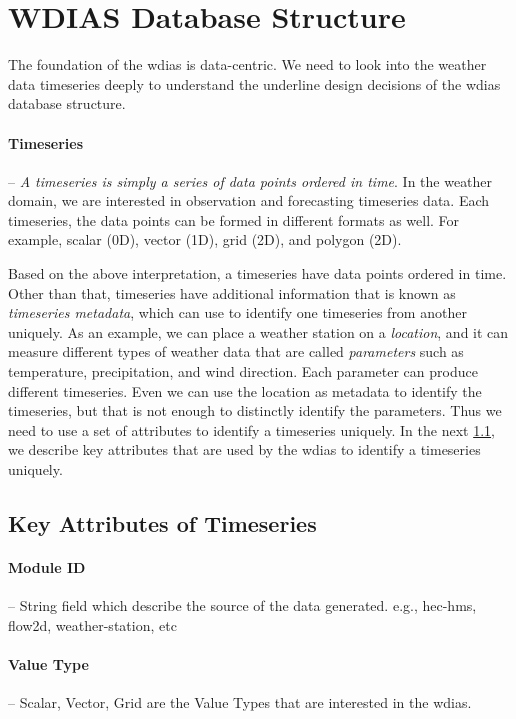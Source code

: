 \section{WDIAS Database Structure}
\label{se:db_struct}

The foundation of the \acrshort{wdias} is data-centric. We need to look into the weather data timeseries deeply to understand the underline design decisions of the \acrshort{wdias} database structure.

\paragraph{Timeseries}-- \emph{A timeseries is simply a series of data points ordered in time}. In the weather domain, we are interested in observation and forecasting timeseries data. Each timeseries, the data points can be formed in different formats as well. For example, scalar (0D), vector (1D), grid (2D), and polygon (2D).

Based on the above interpretation, a timeseries have data points ordered in time. Other than that, timeseries have additional information that is known as \emph{timeseries metadata}, which can use to identify one timeseries from another uniquely. As an example, we can place a weather station on a \emph{location}, and it can measure different types of weather data that are called \emph{parameters} such as temperature, precipitation, and wind direction. Each parameter can produce different timeseries. Even we can use the location as metadata to identify the timeseries, but that is not enough to distinctly identify the parameters. Thus we need to use a set of attributes to identify a timeseries uniquely. In the next \cref{subse:timeseries_key_attributes}, we describe key attributes that are used by the \acrshort{wdias} to identify a timeseries uniquely.


\subsection{Key Attributes of Timeseries}
\label{subse:timeseries_key_attributes}
\paragraph{Module ID}-- String field which describe the source of the data generated. e.g., hec-hms, flow2d, weather-station, etc

\paragraph{Value Type}-- Scalar, Vector, Grid are the Value Types that are interested in the \acrshort{wdias}.

